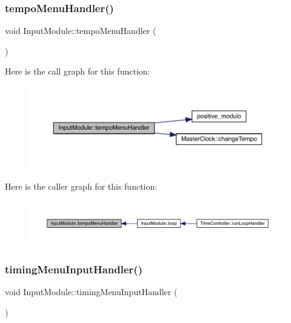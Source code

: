 \mbox{\label{class_input_module_a2e71a13d6f8365f5753fae8f4542769c}} 
\subsubsection{\texorpdfstring{tempo\+Menu\+Handler()}{tempoMenuHandler()}}
{\footnotesize\ttfamily void Input\+Module\+::tempo\+Menu\+Handler (\begin{DoxyParamCaption}{ }\end{DoxyParamCaption})}

Here is the call graph for this function\+:
\nopagebreak
\begin{figure}[H]
\begin{center}
\leavevmode
\includegraphics[width=350pt]{class_input_module_a2e71a13d6f8365f5753fae8f4542769c_cgraph}
\end{center}
\end{figure}
Here is the caller graph for this function\+:
\nopagebreak
\begin{figure}[H]
\begin{center}
\leavevmode
\includegraphics[width=350pt]{class_input_module_a2e71a13d6f8365f5753fae8f4542769c_icgraph}
\end{center}
\end{figure}
\mbox{\label{class_input_module_ab5048e031568fa6879b6618e4478cc97}} 
\subsubsection{\texorpdfstring{timing\+Menu\+Input\+Handler()}{timingMenuInputHandler()}}
{\footnotesize\ttfamily void Input\+Module\+::timing\+Menu\+Input\+Handler (\begin{DoxyParamCaption}{ }\end{DoxyParamCaption})}

